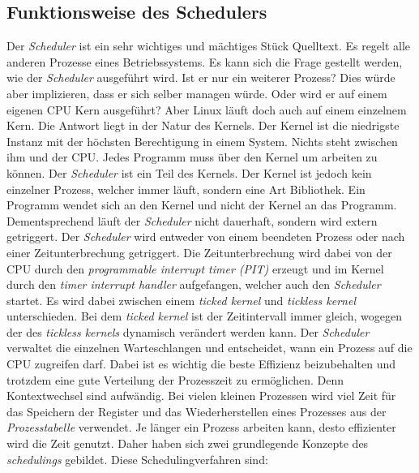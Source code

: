 \newpage

\subsection{Funktionsweise des Schedulers}
Der \textit{Scheduler} ist ein sehr wichtiges und mächtiges Stück Quelltext. Es regelt alle anderen Prozesse eines Betriebssystems. Es kann sich die Frage gestellt werden, wie der \textit{Scheduler} ausgeführt wird. Ist er nur ein weiterer Prozess? Dies würde aber implizieren, dass er sich selber managen würde. Oder wird er auf einem eigenen CPU Kern ausgeführt? Aber Linux läuft doch auch auf einem einzelnem Kern. Die Antwort liegt in der Natur des Kernels.
\medskip
\newline
Der Kernel ist die niedrigste Instanz mit der höchsten Berechtigung in einem System. Nichts steht zwischen ihm und der CPU. Jedes Programm muss über den Kernel um arbeiten zu können. Der \textit{Scheduler} ist ein Teil des Kernels. Der Kernel ist jedoch kein einzelner Prozess, welcher immer läuft, sondern eine Art Bibliothek. Ein Programm wendet sich an den Kernel und nicht der Kernel an das Programm. Dementsprechend läuft der \textit{Scheduler} nicht dauerhaft, sondern wird extern getriggert. Der \textit{Scheduler} wird entweder von einem beendeten Prozess oder nach einer Zeitunterbrechung getriggert. Die Zeitunterbrechung wird dabei von der CPU durch den \textit{programmable interrupt timer (PIT)} erzeugt und im Kernel durch den \textit{timer interrupt handler} aufgefangen, welcher auch den \textit{Scheduler} startet. Es wird dabei zwischen einem \textit{ticked kernel} und \textit{tickless kernel} unterschieden. Bei dem \textit{ticked kernel} ist der Zeitintervall immer gleich, wogegen der des \textit{tickless kernels} dynamisch verändert werden kann.\cite{tickles:Love}
\bigskip
\newline
Der \textit{Scheduler} verwaltet die einzelnen Warteschlangen und entscheidet, wann ein Prozess auf die CPU zugreifen darf. Dabei ist es wichtig die beste Effizienz beizubehalten und trotzdem eine gute Verteilung der Prozesszeit zu ermöglichen. Denn Kontextwechsel sind aufwändig. Bei vielen kleinen Prozessen wird viel Zeit für das Speichern der Register und das Wiederherstellen eines Prozesses aus der \textit{Prozesstabelle} verwendet. Je länger ein Prozess arbeiten kann, desto effizienter wird die Zeit genutzt. Daher haben sich zwei grundlegende Konzepte des \textit{schedulings} gebildet. Diese Schedulingverfahren sind:
